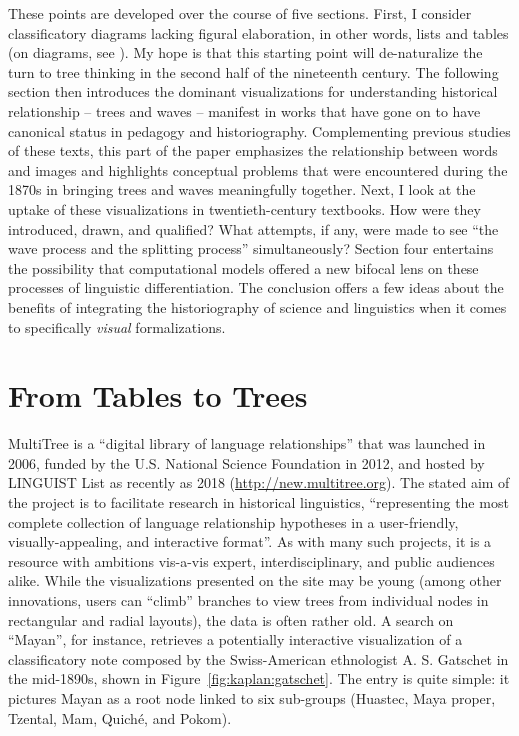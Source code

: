\documentclass[output=paper]{langscibook}
\begin{document}
These points are developed over the course of five sections. First, I consider classificatory diagrams lacking figural elaboration, in other words, lists and tables (on diagrams, see \citealt{Bigg2016}). My hope is that this starting point will de-naturalize the turn to tree thinking in the second half of the nineteenth century. The following section then introduces the dominant visualizations for understanding historical relationship – trees and waves – manifest in works that have gone on to have canonical status in pedagogy and historiography. Complementing previous studies of these texts, this part of the paper emphasizes the relationship between words and images and highlights conceptual problems that were encountered during the 1870s in bringing trees and waves meaningfully together. Next, I look at the uptake of these visualizations in twentieth-century textbooks. How were they introduced, drawn, and qualified? What attempts, if any, were made to see ``the wave process and the splitting process'' simultaneously? Section four entertains the possibility that computational models offered a new bifocal lens on these processes of linguistic differentiation. The conclusion offers a few ideas about the benefits of integrating the historiography of science and linguistics when it comes to specifically \emph{visual} formalizations.

\section{From Tables to Trees}
\label{sec:kaplan:tablestrees}

MultiTree is a ``digital library of language relationships'' that was launched in 2006, funded by the U.S. National Science Foundation in 2012, and hosted by L\textsc{INGUIST} List as recently as 2018 (\url{http://new.multitree.org}). The stated aim of the project is to facilitate research in historical linguistics, ``representing the most complete collection of language relationship hypotheses in a user-friendly, visually-appealing, and interactive format''. As with many such projects, it is a resource with ambitions vis-a-vis expert, interdisciplinary, and public audiences alike. While the visualizations presented on the site may be young (among other innovations, users can ``climb'' branches to view trees from individual nodes in rectangular and radial layouts), the data is often rather old. A search on ``Mayan'', for instance, retrieves a potentially interactive visualization of a classificatory note composed by the Swiss-American ethnologist A. S. Gatschet in the mid-1890s, shown in Figure~\ref{fig:kaplan:gatschet}. The entry is quite simple: it pictures Mayan as a root node linked to six sub-groups (Huastec, Maya proper, Tzental, Mam, Quiché, and Pokom).
\end{document}
